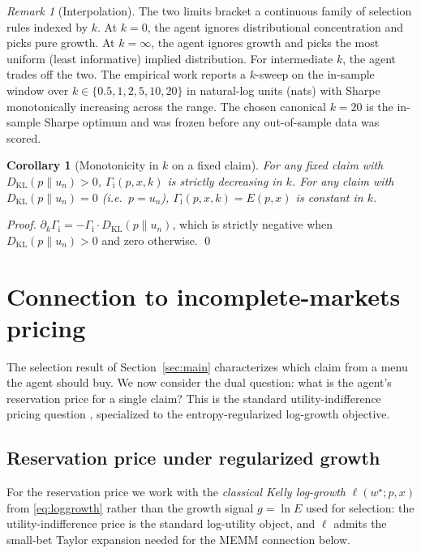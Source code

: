 \documentclass[11pt]{article}
\newtheorem{corollary}[theorem]{Corollary}
\theoremstyle{definition}
\theoremstyle{remark}
\newtheorem{remark}[theorem]{Remark}
\newcommand{\G}{g}
\newcommand{\KL}{D_{\mathrm{KL}}}
\newcommand{\GROUND}{\Gamma_{\mathrm{i}}}
\begin{document}
\begin{remark}[Interpolation]
\label{rem:interpolation}
The two limits bracket a continuous family of selection rules indexed
by $k$. At $k = 0$, the agent ignores distributional concentration and
picks pure growth. At $k = \infty$, the agent ignores growth and picks
the most uniform (least informative) implied distribution. For
intermediate $k$, the agent trades off the two. The empirical work
\citep{mercurio2026empirical} reports a $k$-sweep on the in-sample
window over $k \in \{0.5, 1, 2, 5, 10, 20\}$ in natural-log units
(nats) with Sharpe monotonically increasing across the range. The
chosen canonical $k = 20$ is the in-sample Sharpe optimum and was
frozen before any out-of-sample data was scored.
\end{remark}

\begin{corollary}[Monotonicity in $k$ on a fixed claim]
\label{cor:monotone-k}
For any fixed claim with $\KL(p \| u_n) > 0$,
$\GROUND(p, x, k)$ is strictly decreasing in $k$. For any claim with
$\KL(p \| u_n) = 0$ (i.e.\ $p = u_n$), $\GROUND(p, x, k) = E(p, x)$ is
constant in $k$.
\end{corollary}

\begin{proof}
$\partial_k \GROUND = -\GROUND \cdot \KL(p \| u_n)$, which
is strictly negative when $\KL(p \| u_n) > 0$ and zero otherwise.
\qed
\end{proof}


\section{Connection to incomplete-markets pricing}\label{sec:pricing}

The selection result of Section~\ref{sec:main} characterizes which
claim from a menu the agent should buy. We now consider the dual
question: what is the agent's reservation price for a single claim?
This is the standard utility-indifference pricing question
\citep{rouge2000,delbaen2002}, specialized to the entropy-regularized
log-growth objective.

\subsection{Reservation price under regularized growth}

For the reservation price we work with the \emph{classical Kelly
log-growth} $\ell(w^\star; p, x)$ from \eqref{eq:loggrowth} rather than
the growth signal $\G = \ln E$ used for selection: the
utility-indifference price is the standard log-utility object, and
$\ell$ admits the small-bet Taylor expansion needed for the MEMM
connection below.
\end{document}
